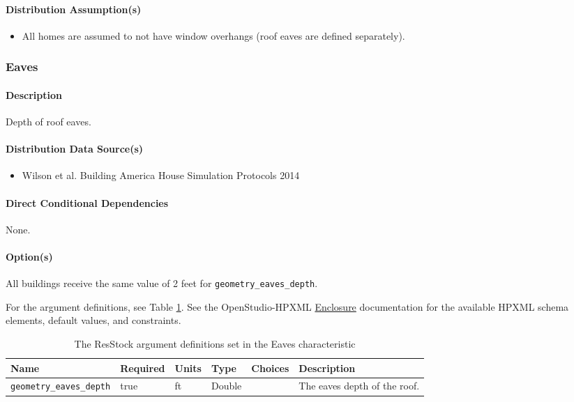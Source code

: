 \paragraph{Distribution Assumption(s)}
\begin{itemize}
\item
  All homes are assumed to not have window overhangs (roof eaves are defined separately).
\end{itemize}

\subsubsection{Eaves}\label{eaves}
\paragraph{Description}
Depth of roof eaves.
\paragraph{Distribution Data Source(s)}
\begin{itemize}
 
\item
  Wilson et al. \textquotesingle Building America House Simulation
  Protocols\textquotesingle{} 2014
\end{itemize}
\paragraph{Direct Conditional Dependencies}


None.

\paragraph{Option(s)}

All buildings receive the same value of 2 feet for \texttt{geometry\_eaves\_depth}. 


For the argument definitions, see Table \ref{table:hc_arg_def_eaves}. See the OpenStudio-HPXML \href{https://openstudio-hpxml.readthedocs.io/en/v1.8.1/workflow_inputs.html#hpxml-enclosure}{Enclosure} documentation for the available HPXML schema elements, default values, and constraints.
\begin{longtable}[]{|p{4.5cm}|p{1.1cm}|p{}|p{1.1cm}|p{1.1cm}|p{4.5cm}|} \caption{The ResStock argument definitions set in the Eaves characteristic} \label{table:hc_arg_def_eaves} \\

\toprule\noalign{}
Name & Required & Units & Type & Choices & Description \\
\midrule\noalign{}
\endhead
\bottomrule\noalign{}
\endlastfoot
\texttt{geometry\_eaves\_depth} & true & ft & Double & & The eaves depth
of the roof. \\
\end{longtable}
